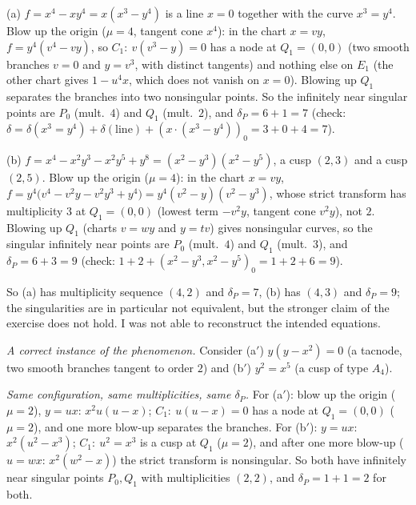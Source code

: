 \documentclass[11pt]{article}
\begin{document}
(a) $f=x^4-xy^4=x(x^3-y^4)$ is a line $x=0$ together with the curve $x^3=y^4$. Blow up the origin ($\mu=4$, tangent cone $x^4$): in the chart $x=vy$, $f=y^4(v^4-vy)$, so $C_1:\ v(v^3-y)=0$ has a node at $Q_1=(0,0)$ (two smooth branches $v=0$ and $y=v^3$, with distinct tangents) and nothing else on $E_1$ (the other chart gives $1-u^4x$, which does not vanish on $x=0$). Blowing up $Q_1$ separates the branches into two nonsingular points. So the infinitely near singular points are $P_0$ (mult.\ $4$) and $Q_1$ (mult.\ $2$), and $\delta_P=6+1=7$ (check: $\delta=\delta(x^3=y^4)+\delta(\text{line})+(x\cdot(x^3-y^4))_0=3+0+4=7$).

(b) $f=x^4-x^2y^3-x^2y^5+y^8=(x^2-y^3)(x^2-y^5)$, a cusp $(2,3)$ and a cusp $(2,5)$. Blow up the origin ($\mu=4$): in the chart $x=vy$, $f=y^4\bigl(v^4-v^2y-v^2y^3+y^4\bigr)=y^4(v^2-y)(v^2-y^3)$, whose strict transform has multiplicity $3$ at $Q_1=(0,0)$ (lowest term $-v^2y$, tangent cone $v^2y$), not $2$. Blowing up $Q_1$ (charts $v=wy$ and $y=tv$) gives nonsingular curves, so the singular infinitely near points are $P_0$ (mult.\ $4$) and $Q_1$ (mult.\ $3$), and $\delta_P=6+3=9$ (check: $1+2+(x^2-y^3,x^2-y^5)_0=1+2+6=9$).

So (a) has multiplicity sequence $(4,2)$ and $\delta_P=7$, (b) has $(4,3)$ and $\delta_P=9$; the singularities are in particular not equivalent, but the stronger claim of the exercise does not hold. I was not able to reconstruct the intended equations.

\emph{A correct instance of the phenomenon.} Consider (a$'$) $y(y-x^2)=0$ (a tacnode, two smooth branches tangent to order $2$) and (b$'$) $y^2=x^5$ (a cusp of type $A_4$).

\emph{Same configuration, same multiplicities, same $\delta_P$.} For (a$'$): blow up the origin ($\mu=2$), $y=ux$: $x^2u(u-x)$; $C_1:\ u(u-x)=0$ has a node at $Q_1=(0,0)$ ($\mu=2$), and one more blow-up separates the branches. For (b$'$): $y=ux$: $x^2(u^2-x^3)$; $C_1:\ u^2=x^3$ is a cusp at $Q_1$ ($\mu=2$), and after one more blow-up ($u=wx$: $x^2(w^2-x)$) the strict transform is nonsingular. So both have infinitely near singular points $P_0,Q_1$ with multiplicities $(2,2)$, and $\delta_P=1+1=2$ for both.
\end{document}

